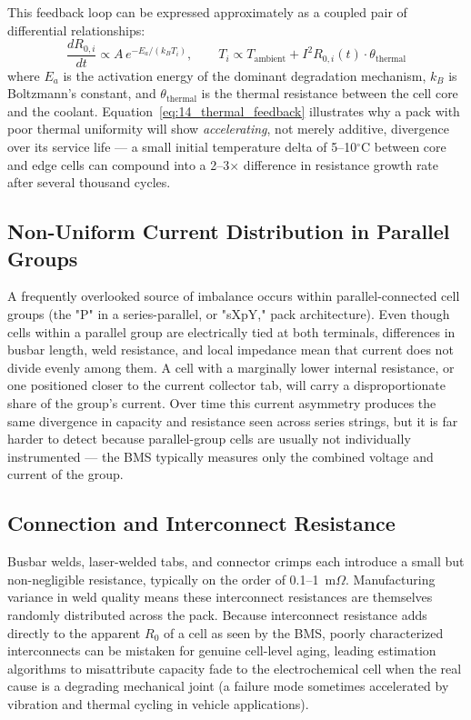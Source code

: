 This feedback loop can be expressed approximately as a coupled pair of differential relationships:
\begin{equation}
    \frac{dR_{0,i}}{dt} \propto A \, e^{-E_a / (k_B T_i)}, \qquad
    T_i \propto T_{\text{ambient}} + I^2 R_{0,i}(t) \cdot \theta_{\text{thermal}}
    \label{eq:14_thermal_feedback}
\end{equation}
where $E_a$ is the activation energy of the dominant degradation mechanism, $k_B$ is Boltzmann's constant, and $\theta_{\text{thermal}}$ is the thermal resistance between the cell core and the coolant. Equation~\ref{eq:14_thermal_feedback} illustrates why a pack with poor thermal uniformity will show \emph{accelerating}, not merely additive, divergence over its service life — a small initial temperature delta of 5–10$^\circ$C between core and edge cells can compound into a 2--3$\times$ difference in resistance growth rate after several thousand cycles.

\subsection{Non-Uniform Current Distribution in Parallel Groups}
\label{subsec:14_parallel_current}

A frequently overlooked source of imbalance occurs within parallel-connected cell groups (the "P" in a series-parallel, or "sXpY," pack architecture). Even though cells within a parallel group are electrically tied at both terminals, differences in busbar length, weld resistance, and local impedance mean that current does not divide evenly among them. A cell with a marginally lower internal resistance, or one positioned closer to the current collector tab, will carry a disproportionate share of the group's current. Over time this current asymmetry produces the same divergence in capacity and resistance seen across series strings, but it is far harder to detect because parallel-group cells are usually not individually instrumented — the BMS typically measures only the combined voltage and current of the group.

\subsection{Connection and Interconnect Resistance}
\label{subsec:14_interconnect}

Busbar welds, laser-welded tabs, and connector crimps each introduce a small but non-negligible resistance, typically on the order of 0.1–1~m$\Omega$. Manufacturing variance in weld quality means these interconnect resistances are themselves randomly distributed across the pack. Because interconnect resistance adds directly to the apparent $R_0$ of a cell as seen by the BMS, poorly characterized interconnects can be mistaken for genuine cell-level aging, leading estimation algorithms to misattribute capacity fade to the electrochemical cell when the real cause is a degrading mechanical joint (a failure mode sometimes accelerated by vibration and thermal cycling in vehicle applications).

